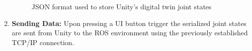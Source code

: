 \begin{enumerate}
\begin{figure}[htbp]
            \caption{JSON format used to store Unity's digital twin joint states}
            \label{fig:json_pub}
            \end{figure}
        \item \textbf{Sending Data:} Upon pressing a UI button trigger the serialized joint states are sent from Unity to the ROS environment using the previously established TCP/IP connection.
    \end{enumerate}


